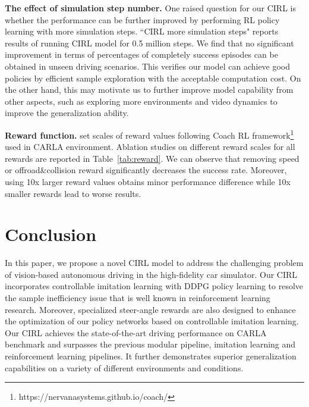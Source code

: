 \documentclass[runningheads]{llncs}
\begin{document}
\noindent\textbf{The effect of simulation step number.} One raised question for our CIRL is whether the performance can be further improved by performing RL policy learning with more simulation steps. ``CIRL more simulation steps" reports results of running CIRL model for 0.5 million steps. We find that no significant improvement in terms of percentages of completely success episodes can be obtained in unseen driving scenarios. This verifies our model can achieve good policies by efficient sample exploration with the acceptable computation cost. On the other hand, this may motivate us to further improve model capability from other aspects, such as exploring more environments and video dynamics to improve the generalization ability. 

\noindent\textbf{Reward function.} set scales of reward values following Coach RL framework\footnote{https://nervanasystems.github.io/coach/} used in CARLA environment. Ablation studies on different reward scales for all rewards are reported in Table~\ref{tab:reward}. We can observe that removing speed or offroad\&collision reward significantly decreases the success rate. Moreover, using 10x larger reward values obtains minor performance difference while 10x smaller rewards lead to worse results.

\section{Conclusion}

In this paper, we propose a novel CIRL model to address the challenging problem of vision-based autonomous driving in the high-fidelity car simulator. Our CIRL incorporates controllable imitation learning with DDPG policy learning to resolve the sample inefficiency issue that is well known in reinforcement learning research. Moreover, specialized steer-angle rewards are also designed to enhance the optimization of our policy networks based on controllable imitation learning. Our CIRL achieves the state-of-the-art driving performance on CARLA benchmark and surpasses the previous modular pipeline, imitation learning and reinforcement learning pipelines. It further demonstrates superior generalization capabilities on a variety of different environments and conditions.

\clearpage



\end{document}
